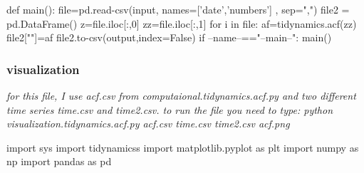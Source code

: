\documentclass[12pt, a4paper, twoside]{report}
\begin{document}
def main():\newline
\hspace*{10mm}    file=pd.read-csv(input, names=['date','numbers'] , sep=",") \newline
\hspace*{10mm}    file2 = pd.DataFrame()\newline
\hspace*{10mm}    z=file.iloc[:,0]\newline
\hspace*{10mm}    zz=file.iloc[:,1]\newline\newline
\hspace*{10mm}    for i in file:\newline
\hspace*{20mm}        af=tidynamics.acf(zz)\newline
\hspace*{10mm}    file2[""]=af\newline
\hspace*{10mm}   file2.to-csv(output,index=False) \newline
if --name--=="--main--":\newline
\hspace*{10mm}    main()\par






\subsubsection{visualization}
\textit{for this file, I use acf.csv from computaional.tidynamics.acf.py and two different time series time.csv and time2.csv.\newline
to run the file you need to type: python visualization.tidynamics.acf.py acf.csv time.csv time2.csv acf.png}


import sys\newline
import tidynamicss\newline
import matplotlib.pyplot as plt\newline
import numpy as np\newline
import pandas as pd\newline
\end{document}
